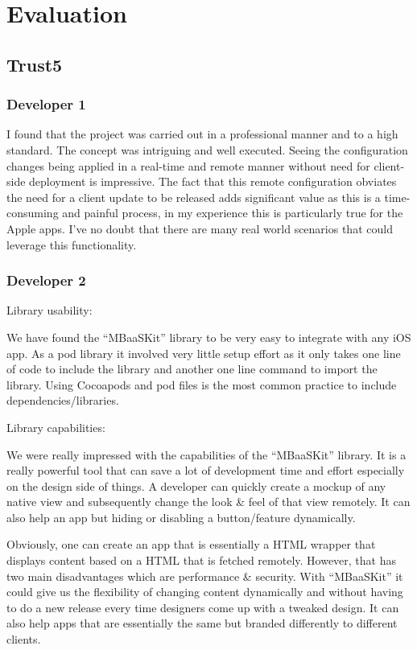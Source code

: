 \section{Evaluation} \label{appendices:evaluation}

\subsection{Trust5}

\subsubsection{Developer 1}

I found that the project was carried out in a professional manner and to a high standard. The concept was intriguing and well executed. Seeing the configuration changes being applied in a real-time and remote manner without need for client-side deployment is impressive. The fact that this remote configuration obviates the need for a client update to be released adds significant value as this is a time-consuming and painful process, in my experience this is particularly true for the Apple apps. I've no doubt that there are many real world scenarios that could leverage this functionality. \cite{email_1}

\subsubsection{Developer 2}

Library usability:

We have found the “MBaaSKit” library to be very easy to integrate with any iOS app. As a pod library it involved very little setup effort as it only takes one line of code to include the library and another one line command to import the library. Using Cocoapods and pod files is the most common practice to include dependencies/libraries.


Library capabilities:

We were really impressed with the capabilities of the “MBaaSKit” library. It is a really powerful tool that can save a lot of development time and effort especially on the design side of things. A developer can quickly create a mockup of any native view and subsequently change the look & feel of that view remotely. It can also help an app but hiding or disabling a button/feature dynamically.

Obviously, one can create an app that is essentially a HTML wrapper that displays content based on a HTML that is fetched remotely. However, that has two main disadvantages which are performance & security. With “MBaaSKit” it could give us the flexibility of changing content dynamically and without having to do a new release every time designers come up with a tweaked design. It can also help apps that are essentially the same but branded differently to different clients.

